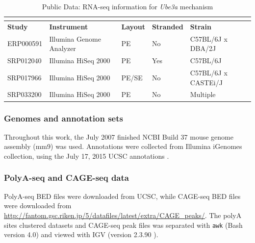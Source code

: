 \begin{longtabu} {X[.8,c]X[2,c]X[0.5,c]X[0.6,c]X[1.7,c]}
  \caption{Public Data: RNA-seq information for \textit{Ube3a} mechanism}\\
  \label{public data:chp3}\\
  \toprule
  \textbf{Study} & \textbf{Instrument} & \textbf{Layout} & \textbf{Stranded} & \textbf{Strain}\\
  \midrule
  \endhead
  ERP000591 & Illumina Genome Analyzer & PE    & No  & C57BL/6J x DBA/2J\\
  SRP012040 & Illumina HiSeq 2000      & PE    & Yes & C57BL/6J\\
  SRP017966 & Illumina HiSeq 2000      & PE/SE & No  & C57BL/6J x CASTEi/J\\
  SRP033200 & Illumina HiSeq 2000      & PE    & No  & Multiple\\
  \bottomrule
\end{longtabu}

\subsubsection*{Genomes and annotation sets}
Throughout this work, the July 2007 finished NCBI Build 37 mouse genome assembly \cite{Chinwalla2002} (mm9) was used. Annotations were collected from Illumina iGenomes collection, using the July 17, 2015 UCSC annotations \cite{Rosenbloom2014}.

\subsubsection*{PolyA-seq and CAGE-seq data}
PolyA-seq BED files \cite{Derti2012} were downloaded from UCSC, while CAGE-seq BED files \cite{Lizio2015} were downloaded from \url{http://fantom.gsc.riken.jp/5/datafiles/latest/extra/CAGE_peaks/}. The polyA sites clustered datasets and CAGE-seq peak files was separated with \texttt{awk} (Bash version 4.0) and viewed with IGV (version 2.3.90 \cite{Thorvaldsdottir2013,Robinson2011}).

